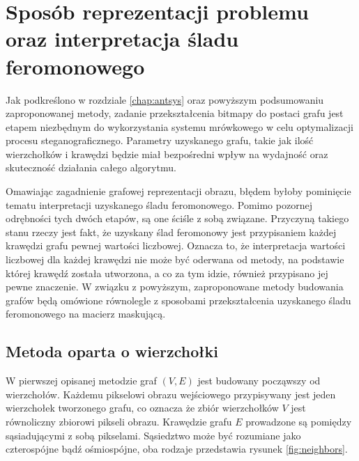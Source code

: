 {    \section{Sposób reprezentacji problemu oraz interpretacja śladu feromonowego}\label{sec:method}
    {
        Jak podkreślono w rozdziale \ref{chap:antsys} oraz powyższym podsumowaniu zaproponowanej metody, zadanie
        przekształcenia bitmapy do postaci grafu jest etapem niezbędnym do wykorzystania systemu mrówkowego w celu
        optymalizacji procesu steganograficznego. Parametry uzyskanego grafu, takie jak ilość wierzchołków i krawędzi
        będzie miał bezpośredni wpływ na wydajność oraz skuteczność działania całego algorytmu.

        Omawiając zagadnienie grafowej reprezentacji obrazu, błędem byłoby pominięcie tematu interpretacji uzyskanego
        śladu feromonowego. Pomimo pozornej odrębności tych dwóch etapów, są one ściśle z sobą związane. Przyczyną
        takiego stanu rzeczy jest fakt, że uzyskany ślad feromonowy jest przypisaniem każdej krawędzi grafu pewnej
        wartości liczbowej. Oznacza to, że interpretacja wartości liczbowej dla każdej krawędzi nie może być oderwana od
        metody, na podstawie której krawędź została utworzona, a co za tym idzie, również przypisano jej pewne
        znaczenie. W związku z powyższym, zaproponowane metody budowania grafów będą omówione równolegle z sposobami
        przekształcenia uzyskanego śladu feromonowego na macierz maskującą.

        \subsection{Metoda oparta o wierzchołki}
        {
            W pierwszej opisanej metodzie graf $(V, E)$ jest budowany począwszy od wierzchołów. Każdemu pikselowi obrazu
            wejściowego przypisywany jest jeden wierzchołek tworzonego grafu, co oznacza że zbiór wierzchołków $V$ jest
            równoliczny zbiorowi pikseli obrazu. Krawędzie grafu $E$ prowadzone są pomiędzy sąsiadującymi z sobą
            pikselami. Sąsiedztwo może być rozumiane jako czterospójne bądź ośmiospójne, oba rodzaje przedstawia rysunek
            \ref{fig:neighbors}.

            \begin{figure}
                \footnotesize
                \centering
                \hspace{8pt}


\end{figure}}}}
